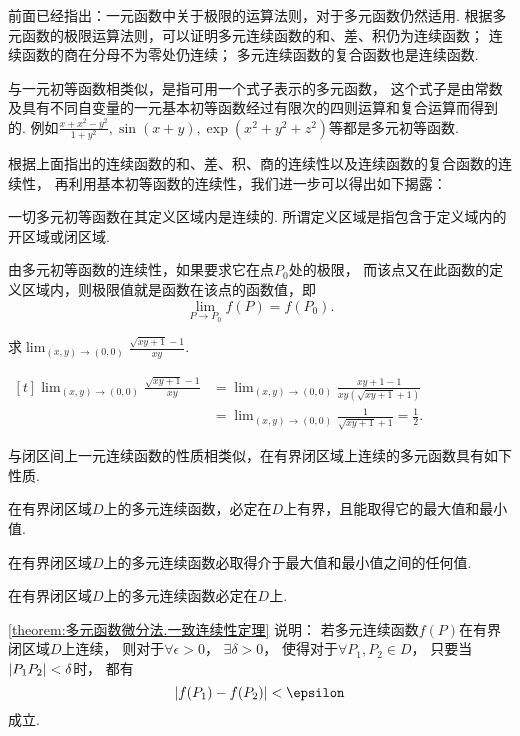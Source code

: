 前面已经指出：一元函数中关于极限的运算法则，对于多元函数仍然适用.
根据多元函数的极限运算法则，可以证明多元连续函数的和、差、积仍为连续函数；
连续函数的商在分母不为零处仍连续；
多元连续函数的复合函数也是连续函数.

与一元初等函数相类似，是指可用一个式子表示的多元函数，
这个式子是由常数及具有不同自变量的一元基本初等函数经过有限次的四则运算和复合运算而得到的.
例如\(\frac{x+x^2-y^2}{1+y^2},\sin(x+y),\exp(x^2+y^2+z^2)\)等都是多元初等函数.

根据上面指出的连续函数的和、差、积、商的连续性以及连续函数的复合函数的连续性，
再利用基本初等函数的连续性，我们进一步可以得出如下揭露：

一切多元初等函数在其定义区域内是连续的.
所谓定义区域是指包含于定义域内的开区域或闭区域.

由多元初等函数的连续性，如果要求它在点\(P_0\)处的极限，
而该点又在此函数的定义区域内，则极限值就是函数在该点的函数值，即\[
	\lim_{P \to P_0} f(P) = f(P_0).
\]

\begin{example}
\def\l{\lim_{(x,y)\to(0,0)}}
求\(\l \frac{\sqrt{xy+1}-1}{xy}\).
\begin{solution}
\(\begin{aligned}[t]
\l \frac{\sqrt{xy+1}-1}{xy}
&= \l \frac{xy+1-1}{xy(\sqrt{xy+1}+1)} \\
&= \l \frac{1}{\sqrt{xy+1}+1}
= \frac{1}{2}.
\end{aligned}\)
\end{solution}
\end{example}

与闭区间上一元连续函数的性质相类似，在有界闭区域上连续的多元函数具有如下性质.

\begin{property}[有界性与最值定理]\label{theorem:多元函数微分法.有界性与最值定理}
在有界闭区域\(D\)上的多元连续函数，必定在\(D\)上有界，且能取得它的最大值和最小值.
\end{property}

\begin{property}[介值定理]\label{theorem:多元函数微分法.介值定理}
在有界闭区域\(D\)上的多元连续函数必取得介于最大值和最小值之间的任何值.
\end{property}

\begin{property}[一致连续性定理]\label{theorem:多元函数微分法.一致连续性定理}
在有界闭区域\(D\)上的多元连续函数必定在\(D\)上.
\end{property}
\cref{theorem:多元函数微分法.一致连续性定理} 说明：
若多元连续函数\(f(P)\)在有界闭区域\(D\)上连续，
则对于\(\forall \epsilon > 0\)，
\(\exists \delta > 0\)，
使得对于\(\forall P_1,P_2 \in D\)，
只要当\(\abs{P_1P_2}<\delta\)时，
都有\[
	\abs{f(P_1)-f(P_2)} < \epsilon
\]成立.

